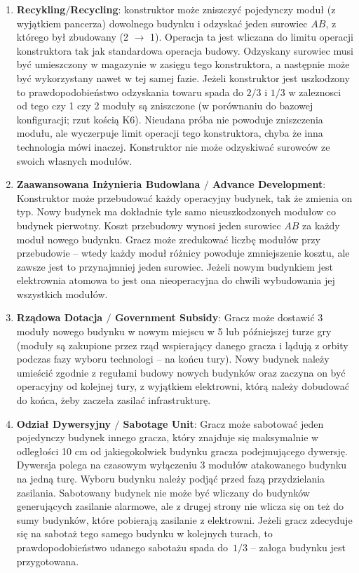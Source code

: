 \documentclass[11pt,a4paper]{article}
\begin{document}
\begin{enumerate}
\item \textbf{Recykling$/$Recycling}: konstruktor może zniszczyć pojedynczy moduł (z wyjątkiem pancerza) dowolnego budynku i odzyskać jeden surowiec $AB$, z którego był zbudowany (2 $\to$ 1). Operacja ta jest wliczana do limitu operacji konstruktora tak jak standardowa operacja budowy. Odzyskany surowiec musi być umieszczony w magazynie w zasięgu tego konstruktora, a następnie może być wykorzystany nawet w tej samej fazie. Jeżeli konstruktor jest uszkodzony to prawdopodobieństwo odzyskania towaru spada do $2/3$ i $1/3$ w zaleznosci od tego czy 1 czy 2 moduły są zniszczone (w porównaniu do bazowej konfiguracji; rzut kością K6). Nieudana próba nie powoduje zniszczenia modułu, ale wyczerpuje limit operacji tego konstruktora, chyba że inna technologia mówi inaczej. Konstruktor nie może odzyskiwać surowców ze swoich własnych modułów.
\item \textbf{Zaawansowana Inżynieria Budowlana $/$ Advance Development}: Konstruktor może przebudować każdy operacyjny budynek, tak że zmienia on typ. Nowy budynek ma dokładnie tyle samo nieuszkodzonych modułow co budynek pierwotny. Koszt przebudowy wynosi jeden surowiec $AB$ za każdy moduł nowego budynku. Gracz może zredukować liczbę modułów przy przebudowie -- wtedy każdy moduł różnicy powoduje zmniejszenie kosztu, ale zawsze jest to przynajmniej jeden surowiec. Jeżeli nowym budynkiem jest elektrownia atomowa to jest ona nieoperacyjna do chwili wybudowania jej wszystkich modułów.
\item \textbf{Rządowa Dotacja $/$ Government Subsidy}: Gracz może dostawić 3 moduły nowego budynku w nowym miejscu w 5 lub późniejszej turze gry (moduły są zakupione przez rząd wspierający danego gracza i lądują z orbity podczas fazy wyboru technologi -- na końcu tury). Nowy budynek należy umieścić zgodnie z regułami budowy nowych budynków oraz zaczyna on być operacyjny od kolejnej tury, z wyjątkiem elektrowni, którą należy dobudować do końca, żeby zaczeła zasilać infrastrukturę.
\item \textbf{Odział Dywersyjny $/$ Sabotage Unit}: Gracz może sabotować jeden pojedynczy budynek innego gracza, który znajduje się maksymalnie w odległości 10 cm od jakiegokolwiek budynku gracza podejmującego dywersję. Dywersja polega na czasowym wyłączeniu 3 modułów atakowanego budynku na jedną turę. Wyboru budynku należy podjąć przed fazą przydzielania zasilania. Sabotowany budynek nie może być wliczany do budynków generujących zasilanie alarmowe, ale z drugej strony nie wlicza się on też do sumy budynków, które pobierają zasilanie z elektrowni. Jeżeli gracz zdecyduje się na sabotaż tego samego budynku w kolejnych turach, to prawdopodobieństwo udanego sabotażu spada do~$1/3$ -- załoga budynku jest przygotowana.

\end{enumerate}
\end{document}
